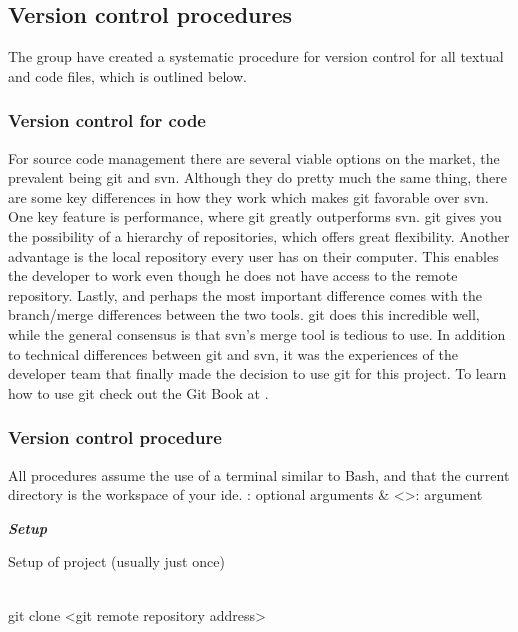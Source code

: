 

\subsection{Version control procedures}
The group have created a systematic procedure for version control for all textual and code files, which is outlined below.

\subsubsection{Version control for code}
For source code management there are several viable options on the market, the prevalent being \gls{git} and \gls{svn}. Although they do pretty much the same thing, there are some key differences in how they work which makes \gls{git} favorable over \gls{svn}. One key feature is performance, where \gls{git} greatly outperforms \gls{svn}. \gls{git} gives you the possibility of a hierarchy of repositories, which offers great flexibility. Another advantage is the local repository every user has on their computer. This enables the developer to work even though he does not have access to the remote repository. Lastly, and perhaps the most important difference comes with the branch/merge differences between the two tools. \gls{git} does this incredible well, while the general consensus is that \gls{svn}’s merge tool is tedious to use.  
\newline
\newline
In addition to technical differences between \gls{git} and \gls{svn}, it was the experiences of the developer team that finally made the decision to use \gls{git} for this project. To learn how to use \gls{git} check out the Git Book at \cite{bib:gitbook}.

\subsubsection{Version control procedure}
All procedures assume the use of a terminal similar to Bash, and that the current directory is the workspace of your \gls{ide}.
\newline
\newline
[]: optional arguments \& <>: argument

\textit{\textbf{Setup}}
\begin{description}
	{\indentitem \item[Description:] Setup of project (usually just once)}
	{\indentitem \item[Command:] \hfill \\
	\hspace*{3em} git clone <git remote repository address>}
\end{description}


